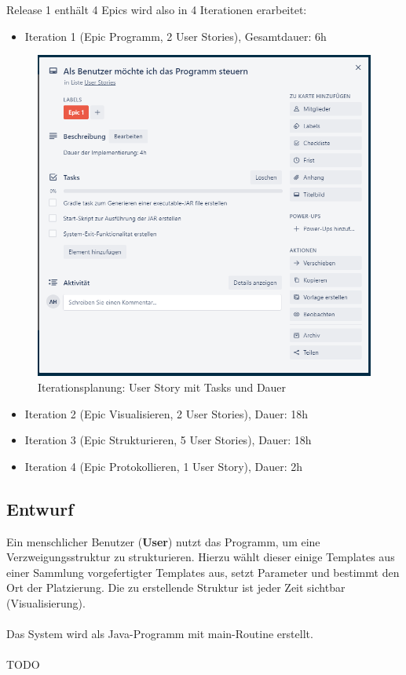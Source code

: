\documentclass[11pt]{article}
\begin{document}
    \newpage

    Release 1 enthält 4 Epics wird also in 4 Iterationen erarbeitet:
    \begin{itemize}
        \item Iteration 1 (Epic Programm, 2 User Stories), Gesamtdauer: 6h
    \end{itemize}
    \begin{figure}[H]
        \centering
        \includegraphics[width=12cm]{../images/User_Story_1.PNG}
        \caption{Iterationsplanung: User Story mit Tasks und Dauer}
    \end{figure}
    \begin{itemize}
        \item Iteration 2 (Epic Visualisieren, 2 User Stories), Dauer: 18h
        \item Iteration 3 (Epic Strukturieren, 5 User Stories), Dauer: 18h
        \item Iteration 4 (Epic Protokollieren, 1 User Story), Dauer: 2h
    \end{itemize}

    \newpage
    
    \subsection{Entwurf}
    Ein menschlicher Benutzer (\textbf{User}) nutzt das Programm, um eine Verzweigungsstruktur zu strukturieren.
    Hierzu wählt dieser einige Templates aus einer Sammlung vorgefertigter Templates aus, setzt Parameter und
    bestimmt den Ort der Platzierung.
    Die zu erstellende Struktur ist jeder Zeit sichtbar (Visualisierung).\\~\\
    Das System wird als Java-Programm mit main-Routine erstellt.\\~\\
    TODO
\end{document}
